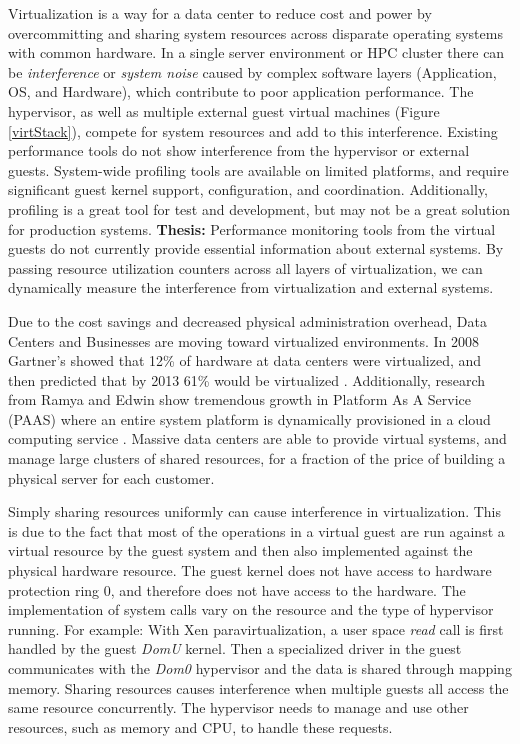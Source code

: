 Virtualization is a way for a data center to reduce cost and power by overcommitting and sharing system resources across disparate operating systems with common hardware.  
In a single server environment or HPC cluster there can be \emph{interference} \cite{paul} or \emph{system noise}\cite{tsafrir} caused by complex software layers (Application, OS, and Hardware), which contribute to poor application performance.  
The hypervisor, as well as multiple external guest virtual machines (Figure \ref{virtStack}), compete for system resources and add to this interference.  
Existing performance tools do not show interference from the hypervisor or external guests.  
System-wide profiling tools are available on limited platforms, and require significant guest kernel support, configuration, and coordination.  
Additionally, profiling is a great tool for test and development, but may not be a great solution for production systems.
\textbf{Thesis:  }Performance monitoring tools from the virtual guests do not currently provide essential information about external systems.  By passing resource utilization counters across all layers of virtualization, we can dynamically measure the interference from virtualization and external systems.

\indent Due to the cost savings and decreased physical administration overhead, Data Centers and Businesses are moving toward virtualized environments.  In 2008 Gartner’s showed that 12\% of hardware at data centers were virtualized, and then predicted that by 2013 61\% would be virtualized \cite{gartners}.   Additionally, research from Ramya and Edwin show tremendous growth in Platform As A Service (PAAS) where an entire system platform is dynamically provisioned in a cloud computing service \cite{ramya}.   Massive data centers are able to provide virtual systems, and manage large clusters of shared resources, for a fraction of the price of building a physical server for each customer.

\indent Simply sharing resources uniformly can cause interference in virtualization.  This is due to the fact that most of the operations in a virtual guest are run against a virtual resource by the guest system and then also implemented against the physical hardware resource.  The guest kernel does not have access to hardware protection ring 0, and therefore does not have access to the hardware.  The implementation of system calls vary on the resource and the type of hypervisor running.  For example:  With Xen paravirtualization, a user space \emph{read} call is first handled by the guest \emph{DomU} kernel.  Then a specialized driver in the guest communicates with the \emph{Dom0} hypervisor and the data is shared through mapping memory.  Sharing resources causes interference when multiple guests all access the same resource concurrently.  The hypervisor needs to manage and use other resources, such as memory and CPU, to handle these requests.

